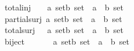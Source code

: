 \begin{isabellebody}
\isanewline
total{\isacharunderscore}inj\ \ \ \ {\isacharcolon}{\isacharcolon}{\isachardoublequoteopen}{\isacharbrackleft}{\isacharprime}a\ set{\isacharcomma}{\isacharprime}b\ set{\isacharbrackright}\ {\isacharequal}{\isachargreater}\ {\isacharparenleft}{\isacharprime}a\ {\isacharless}{\isacharequal}{\isachargreater}\ {\isacharprime}b{\isacharparenright}\ set{\isachardoublequoteclose}\ \ \ \ \ {\isacharparenleft}{\isachardoublequoteopen}{\isacharunderscore}\ {\isachargreater}{\isacharminus}{\isacharminus}{\isachargreater}\ {\isacharunderscore}{\isachardoublequoteclose}\ \ \ {\isacharbrackleft}{}{}{\isacharcomma}{}{}{\isacharbrackright}\ {}{}{\isacharparenright}\isanewline
\isanewline
partial{\isacharunderscore}surj\ {\isacharcolon}{\isacharcolon}{\isachardoublequoteopen}{\isacharbrackleft}{\isacharprime}a\ set{\isacharcomma}{\isacharprime}b\ set{\isacharbrackright}\ {\isacharequal}{\isachargreater}\ {\isacharparenleft}{\isacharprime}a\ {\isacharless}{\isacharequal}{\isachargreater}\ {\isacharprime}b{\isacharparenright}\ set{\isachardoublequoteclose}\ \ \ \ \ {\isacharparenleft}{\isachardoublequoteopen}{\isacharunderscore}\ {\isacharminus}{\isacharbar}{\isacharminus}{\isachargreater}{\isachargreater}\ {\isacharunderscore}{\isachardoublequoteclose}\ \ {\isacharbrackleft}{}{}{\isacharcomma}{}{}{\isacharbrackright}\ {}{}{\isacharparenright}\isanewline
\isanewline
total{\isacharunderscore}surj\ \ \ {\isacharcolon}{\isacharcolon}{\isachardoublequoteopen}{\isacharbrackleft}{\isacharprime}a\ set{\isacharcomma}{\isacharprime}b\ set{\isacharbrackright}\ {\isacharequal}{\isachargreater}\ {\isacharparenleft}{\isacharprime}a\ {\isacharless}{\isacharequal}{\isachargreater}\ {\isacharprime}b{\isacharparenright}\ set{\isachardoublequoteclose}\ \ \ \ \ {\isacharparenleft}{\isachardoublequoteopen}{\isacharunderscore}\ {\isacharminus}{\isacharminus}{\isachargreater}{\isachargreater}\ {\isacharunderscore}{\isachardoublequoteclose}\ \ \ {\isacharbrackleft}{}{}{\isacharcomma}{}{}{\isacharbrackright}\ {}{}{\isacharparenright}\isanewline
\isanewline
biject\ \ \ \ \ \ \ {\isacharcolon}{\isacharcolon}{\isachardoublequoteopen}{\isacharbrackleft}{\isacharprime}a\ set{\isacharcomma}{\isacharprime}b\ set{\isacharbrackright}\ {\isacharequal}{\isachargreater}\ {\isacharparenleft}{\isacharprime}a\ {\isacharless}{\isacharequal}{\isachargreater}\ {\isacharprime}b{\isacharparenright}\ set{\isachardoublequoteclose}\ \ \ \ \ {\isacharparenleft}{\isachardoublequoteopen}{\isacharunderscore}\ {\isachargreater}{\isacharminus}{\isacharminus}{\isachargreater}{\isachargreater}\ {\isacharunderscore}{\isachardoublequoteclose}\ \ {\isacharbrackleft}{}{}{\isacharcomma}{}{}{\isacharbrackright}\ {}{}{\isacharparenright}\isanewline

\end{isabellebody}
